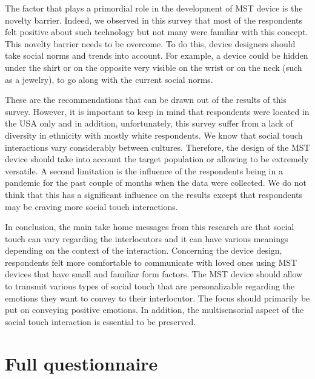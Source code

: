 \documentclass[acmsmall]{acmart}
\begin{document}
The factor that plays a primordial role in the development of MST device is the novelty barrier. Indeed, we observed in this survey that most of the respondents felt positive about such technology but not many were familiar with this concept. This novelty barrier needs to be overcome. To do this, device designers should take social norms and trends into account. For example, a device could be hidden under the shirt or on the opposite very visible on the wrist or on the neck (such as a jewelry), to go along with the current social norms.
  
These are the recommendations that can be drawn out of the results of this survey. However, it is important to keep in mind that respondents were located in the USA only and in addition, unfortunately, this survey suffer from a lack of diversity in ethnicity with mostly white respondents. We know that social touch interactions vary considerably between cultures. Therefore, the design of the MST device should take into account the target population or allowing to be extremely versatile. 
A second limitation is the influence of the respondents being in a pandemic for the past couple of months when the data were collected. We do not think that this has a significant influence on the results except that respondents may be craving more social touch interactions.  

In conclusion, the main take home messages from this research are that social touch can vary regarding the interlocutors and it can have various meanings depending on the context of the interaction. Concerning the device design, respondents felt more comfortable to communicate with loved ones using MST devices that have small and familiar form factors. The MST device should allow to transmit various types of social touch that are personalizable regarding the emotions they want to convey to their interlocutor. The focus should primarily be put on conveying positive emotions. In addition, the multisensorial aspect of the social touch interaction is essential to be preserved.





\appendix

\section{Full questionnaire}
\label{app1}
\end{document}
